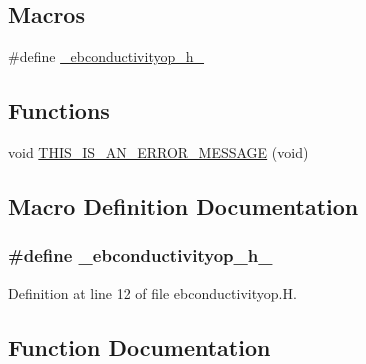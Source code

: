 \subsection*{Macros}
\begin{DoxyCompactItemize}
\item 
\#define \hyperlink{ebconductivityop_8H_a37e9bbcf6143f8c524562d0c9332a6e5}{\+\_\+ebconductivityop\+\_\+h\+\_\+}
\end{DoxyCompactItemize}
\subsection*{Functions}
\begin{DoxyCompactItemize}
\item 
void \hyperlink{ebconductivityop_8H_aa1856fd2987ff0bb69f827d916bb5685}{T\+H\+I\+S\+\_\+\+I\+S\+\_\+\+A\+N\+\_\+\+E\+R\+R\+O\+R\+\_\+\+M\+E\+S\+S\+A\+GE} (void)
\end{DoxyCompactItemize}


\subsection{Macro Definition Documentation}
\subsubsection[{\texorpdfstring{\+\_\+ebconductivityop\+\_\+h\+\_\+}{_ebconductivityop_h_}}]{\setlength{\rightskip}{0pt plus 5cm}\#define \+\_\+ebconductivityop\+\_\+h\+\_\+}\hypertarget{ebconductivityop_8H_a37e9bbcf6143f8c524562d0c9332a6e5}{}\label{ebconductivityop_8H_a37e9bbcf6143f8c524562d0c9332a6e5}


Definition at line 12 of file ebconductivityop.\+H.



\subsection{Function Documentation}
